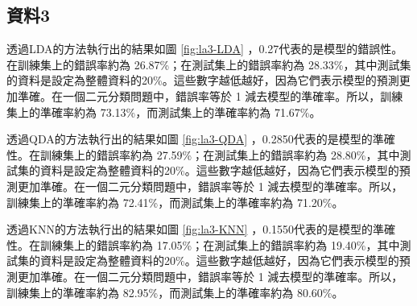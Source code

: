 \documentclass[12pt, a4paper]{article}
\begin{document}
\subsection{資料3}
透過LDA的方法執行出的結果如圖 \ref{fig:la3-LDA} ，0.27代表的是模型的錯誤性。在訓練集上的錯誤率約為 26.87\%；在測試集上的錯誤率約為 28.33\%，其中測試集的資料是設定為整體資料的20\%。這些數字越低越好，因為它們表示模型的預測更加準確。在一個二元分類問題中，錯誤率等於 1 減去模型的準確率。所以，訓練集上的準確率約為 73.13\%，而測試集上的準確率約為 71.67\%。

透過QDA的方法執行出的結果如圖 \ref{fig:la3-QDA} ，0.2850代表的是模型的準確性。在訓練集上的錯誤率約為 27.59\%；在測試集上的錯誤率約為 28.80\%，其中測試集的資料是設定為整體資料的20\%。這些數字越低越好，因為它們表示模型的預測更加準確。在一個二元分類問題中，錯誤率等於 1 減去模型的準確率。所以，訓練集上的準確率約為 72.41\%，而測試集上的準確率約為 71.20\%。

透過KNN的方法執行出的結果如圖 \ref{fig:la3-KNN} ，0.1550代表的是模型的準確性。在訓練集上的錯誤率約為 17.05\%；在測試集上的錯誤率約為 19.40\%，其中測試集的資料是設定為整體資料的20\%。這些數字越低越好，因為它們表示模型的預測更加準確。在一個二元分類問題中，錯誤率等於 1 減去模型的準確率。所以，訓練集上的準確率約為 82.95\%，而測試集上的準確率約為 80.60\%。
\end{document}
